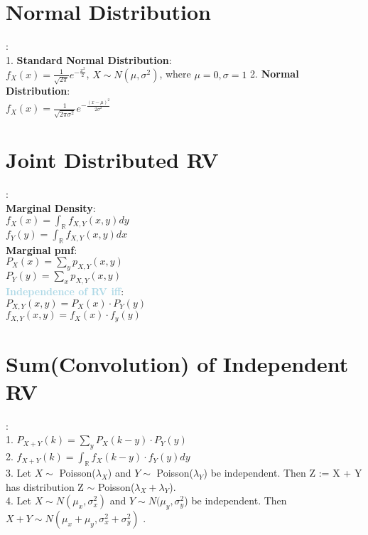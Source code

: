 \documentclass[twocolumn]{article}
\newcommand{\method}[1]{\textbf{\textcolor{lightblue}{#1}}}
\newcommand{\sectionspace}{\vspace*{1em}}
\begin{document}
\sectionspace

\section{Normal Distribution}
:\\
1. \textbf{Standard Normal Distribution}:\\
$f_X(x) = \frac{1}{\sqrt{2\pi}} e^{-\frac{x^2}{2}}$, $X \sim N(\mu, \sigma^2)$, where $\mu = 0, \sigma = 1$
2. \textbf{Normal Distribution}:\\
$f_X(x) = \frac{1}{\sqrt{2\pi \sigma^2}} e^{-\frac{(x-\mu)^2}{2\sigma^2}}$

\sectionspace

\section{Joint Distributed RV}
:\\
\textbf{Marginal Density}:\\
$f_X(x) = \int_{\mathbb{R}} f_{X,Y}(x,y) dy$\\
$f_Y(y) = \int_{\mathbb{R}} f_{X,Y}(x,y) dx$\\

\textbf{Marginal pmf}:\\
$P_X(x) = \sum_{y} p_{X,Y}(x,y)$\\
$P_Y(y) = \sum_{x} p_{X,Y}(x,y)$\\

\method{\textbf{Independence of RV iff}}:\\
$P_{X,Y}(x,y) = P_X(x) \cdot P_Y(y)$\\
$f_{X,Y}(x,y)  = f_X(x)  \cdot f_y(y)$

\sectionspace

\section{Sum(Convolution) of Independent RV}
:\\
1. $P_{X+Y}(k) = \sum_{y} P_X(k-y) \cdot P_Y(y) $\\
2. $f_{X+Y}(k)  = \int_{\mathbb{R}} f_X(k-y) \cdot f_Y(y) dy$\\
3.  Let $X \sim$ Poisson($\lambda_X$) and $Y \sim $ Poisson($\lambda_Y$) be independent. Then Z := X + Y has distribution Z $\sim$ Poisson($ \lambda_X + \lambda_Y$).\\
4. Let $X \sim N( \mu_x, \sigma_x^2)$ and $Y \sim N(\mu_y,\sigma_y^2$) be independent. Then $X + Y \sim N ( \mu_x + \mu_y ,  \sigma_x^2 + \sigma_y^2 )$ .
\end{document}
